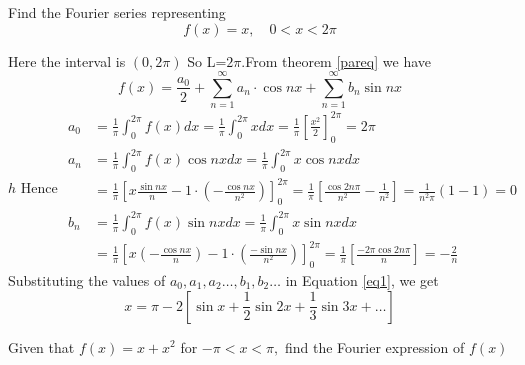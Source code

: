 \begin{exercise}
	 Find the Fourier series representing $$f(x)=x, \quad 0<x<2 \pi$$
\end{exercise}
\begin{answer}
Here the interval is $(0,2\pi)$ So L=$2\pi$.From theorem \ref{pareq} we have
\begin{equation}
\label{eq1}
f(x)=\frac{a_{0}}{2}+\sum_{n=1}^{\infty} a_{n} \cdot \cos n x+\sum_{n=1}^{\infty} b_{n} \sin n x
\end{equation}
$$h
\text { Hence } \begin{aligned}
a_{0} &=\frac{1}{\pi} \int_{0}^{2 \pi} f(x) d x=\frac{1}{\pi} \int_{0}^{2 \pi} x d x=\frac{1}{\pi}\left[\frac{x^{2}}{2}\right]_{0}^{2 \pi}=2 \pi \\
a_{n} &=\frac{1}{\pi} \int_{0}^{2 \pi} f(x) \cos n x d x=\frac{1}{\pi} \int_{0}^{2 \pi} x \cos n x d x \\
&=\frac{1}{\pi}\left[x \frac{\sin n x}{n}-1 \cdot\left(-\frac{\cos n x}{n^{2}}\right)\right]_{0}^{2 \pi}=\frac{1}{\pi}\left[\frac{\cos 2 n \pi}{n^{2}}-\frac{1}{n^{2}}\right]=\frac{1}{n^{2} \pi}(1-1)=0 \\
b_{n} &=\frac{1}{\pi} \int_{0}^{2 \pi} f(x) \sin n x d x=\frac{1}{\pi} \int_{0}^{2 \pi} x \sin n x d x \\
&=\frac{1}{\pi}\left[x\left(-\frac{\cos n x}{n}\right)-1 \cdot\left(\frac{-\sin n x}{n^{2}}\right)\right]_{0}^{2 \pi}=\frac{1}{\pi}\left[\frac{-2 \pi \cos 2 n \pi}{n}\right]=-\frac{2}{n}
\end{aligned}
$$
Substituting the values of $a_{0}, a_{1}, a_{2} \ldots, b_{1}, b_{2} \ldots$ in Equation \ref{eq1}, we get
$$
x=\pi-2\left[\sin x+\frac{1}{2} \sin 2 x+\frac{1}{3} \sin 3 x+\ldots\right]
$$
\end{answer}
\begin{exercise}
Given that $f(x)=x+x^{2}$ for $-\pi<x<\pi,$ find the Fourier expression of $f(x)$
\end{exercise}

